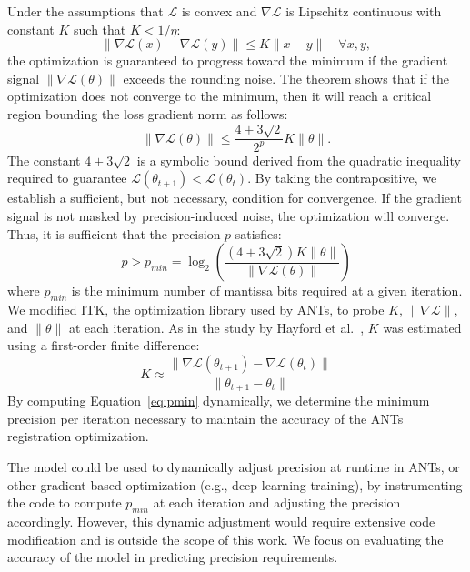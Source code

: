 \documentclass[journal,twoside,web]{ieeecolor}
\begin{document}
Under the assumptions that $\mathcal{L}$ is convex and $\nabla \mathcal{L}$ is Lipschitz continuous with constant $K$ such that $K < 1/\eta$:
\begin{equation}
	\|\nabla \mathcal{L}(x) - \nabla \mathcal{L}(y)\| \leq K \|x - y\| \quad \forall x, y,
\end{equation}
the optimization is guaranteed to progress toward the minimum if the gradient signal $\|\nabla \mathcal{L}(\theta)\|$ exceeds the rounding noise. The theorem shows that if the optimization does not converge to the minimum, then it will reach a critical region bounding the loss gradient norm as follows:
\begin{equation}
	\|\nabla \mathcal{L}(\theta)\| \leq \frac{4+3\sqrt{2}}{2^{p}} K \|\theta\|.
\end{equation}
The constant $4+3\sqrt{2}$ is a symbolic bound derived from the quadratic inequality required to guarantee $\mathcal{L}(\theta_{t+1}) < \mathcal{L}(\theta_t)$. By taking the contrapositive, we establish a sufficient, but not necessary, condition for convergence. If the gradient signal is not masked by precision-induced noise, the optimization will converge. Thus, it is sufficient that the precision $p$ satisfies:
\begin{equation}
	p > p_{min} = \log_2 \left( \frac{(4+3\sqrt{2}) K \|\theta\|}{\|\nabla\mathcal{L}(\theta)\|} \right)
	\label{eq:pmin}
\end{equation}
where $p_{min}$ is the minimum number of mantissa bits required at a given iteration. We modified ITK, the optimization library used by ANTs, to probe $K$,
$\|\nabla \mathcal{L}\|$, and $\|\theta\|$ at each iteration. As in the study
	by Hayford et al.~\cite{Hayford2024-kb}, $K$ was estimated using a first-order finite difference:
\begin{equation}
	K \approx \frac{\|\nabla \mathcal{L}(\theta_{t+1}) - \nabla \mathcal{L}(\theta_t)\|}{\|\theta_{t+1} - \theta_t\|}
\end{equation}
By computing Equation~\ref{eq:pmin} dynamically, we determine the minimum precision per iteration necessary to maintain the accuracy of the ANTs registration optimization.

The model could be used to dynamically adjust precision at runtime in ANTs, or other gradient-based optimization (e.g., deep learning training), by instrumenting the code to compute $p_{min}$ at each iteration and adjusting the precision accordingly. However, this dynamic adjustment would require extensive code modification and is outside the scope of this work. We focus on evaluating the accuracy of the model in predicting precision requirements.
\end{document}

